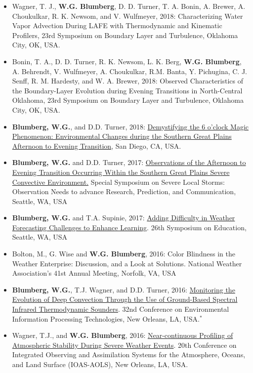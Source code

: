 \documentclass[10pt]{res} %
\begin{document}
\begin{resume}
\begin{itemize}
\item Wagner, T. J., \textbf{W.G. Blumberg}, D. D. Turner, T. A. Bonin, A. Brewer, A. Choukulkar, R. K. Newsom, and V. Wulfmeyer, 2018: Characterizing Water Vapor Advection During LAFE with Thermodynamic and Kinematic Profilers, 23rd Symposium on Boundary Layer and Turbulence, Oklahoma City, OK, USA. 
\item Bonin, T. A., D. D. Turner, R. K. Newsom, L. K. Berg, \textbf{W.G. Blumberg}, A. Behrendt, V. Wulfmeyer, A. Choukulkar, R.M. Banta, Y. Pichugina, C. J. Senff, R. M. Hardesty, and W. A. Brewer, 2018: Observed Characteristics of the Boundary-Layer Evolution during Evening Transitions in North-Central Oklahoma, 23rd Symposium on Boundary Layer and Turbulence, Oklahoma City, OK, USA. 
\item \textbf{Blumberg, W.G.}, and D.D. Turner, 2018: \href{https://ams.confex.com/ams/17MESO/webprogram/Paper320204.html}{Demystifying the 6 o'clock Magic Phenomenon: Environmental Changes during the Southern Great Plains Afternoon to Evening Transition}, San Diego, CA, USA.
\item \textbf{Blumberg, W.G.} and D.D. Turner, 2017: \href{https://ams.confex.com/ams/97Annual/webprogram/Paper313841.html}{Observations of the Afternoon to Evening Transition Occurring Within the Southern Great Plains Severe Convective Environment.} Special Symposium on Severe Local Storms: Observation Needs to advance Research, Prediction, and Communication, Seattle, WA, USA
\item \textbf{Blumberg, W.G.} and T.A. Supinie, 2017: \href{https://ams.confex.com/ams/97Annual/webprogram/Paper315011.html}{Adding Difficulty in Weather Forecasting Challenges to Enhance Learning}. 26th Symposium on Education, Seattle, WA, USA
\item Bolton, M., G. Wise and \textbf{W.G. Blumberg}, 2016: Color Blindness in the Weather Enterprise: Discussion, and a Look at Solutions. National Weather Association's 41st Annual Meeting, Norfolk, VA, USA
\item \textbf{Blumberg, W.G.}, T.J. Wagner, and D.D. Turner, 2016: \href{https://ams.confex.com/ams/96Annual/webprogram/Paper284726.html}{Monitoring the Evolution of Deep Convection Through the Use of Ground-Based Spectral Infrared Thermodynamic Sounders}. 32nd Conference on Environmental Information Processing Technologies, New Orleans, LA, USA.$^{*}$
\item Wagner, T.J., and \textbf{W.G. Blumberg}, 2016: \href{https://ams.confex.com/ams/96Annual/webprogram/Paper289298.html}{Near-continuous Profiling of Atmospheric Stability During Severe Weather Events}.  20th Conference on Integrated Observing and Assimilation Systems for the Atmosphere, Oceans, and Land Surface (IOAS-AOLS), New Orleans, LA, USA.

\end{itemize}
\end{resume}
\end{document}
